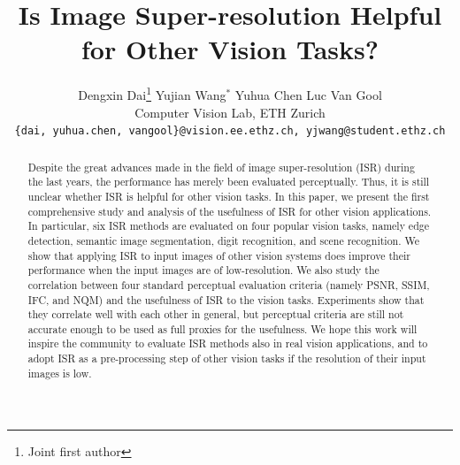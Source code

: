 \documentclass[10pt,twocolumn,letterpaper]{article}
\begin{document}
\title{Is Image Super-resolution Helpful for Other Vision Tasks?}
\author{Dengxin Dai\thanks{Joint first author}  \hspace{.4cm} Yujian Wang$^*$ \hspace{.4cm}  Yuhua Chen \hspace{.4cm} Luc Van Gool\\
Computer Vision Lab, ETH Zurich\\
{\tt\small \{dai, yuhua.chen, vangool\}@vision.ee.ethz.ch, yjwang@student.ethz.ch}
}

\maketitle
\ifwacvfinal\thispagestyle{empty}\fi

\begin{abstract}
  Despite the great advances made in the field of image super-resolution (ISR)
  during the last years, the performance has merely been evaluated
  perceptually. Thus, it is still unclear whether ISR is helpful for other
  vision tasks. In this paper, we present the first
  comprehensive study and analysis of the usefulness of ISR for other
  vision applications. In particular, six ISR methods are evaluated
  on four popular vision tasks, namely edge detection, semantic image
  segmentation, digit recognition, and scene recognition. We show that applying ISR to input images of other vision
  systems does improve their performance when the input images are of
  low-resolution. 
We also study the correlation between four standard perceptual evaluation criteria (namely 
PSNR, SSIM, IFC, and NQM) 
and the usefulness of ISR to the vision tasks. 
Experiments show that they correlate well with each other in general,  
but perceptual criteria are still not accurate enough to be used as  full proxies 
for the usefulness. We hope this work will inspire the community to evaluate ISR 
methods also in real vision applications,  and to adopt ISR as a pre-processing step of other
  vision tasks if the resolution of their input images is low.

\end{abstract}
\end{document}
